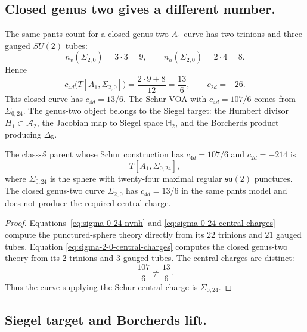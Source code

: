 \subsection*{Closed genus two gives a different number.}

The same pants count for a closed genus-two $A_1$ curve has two
trinions and three gauged $SU(2)$ tubes:
\begin{equation}
  n_v(\Sigma_{2,0})=3\cdot3=9,
  \qquad
  n_h(\Sigma_{2,0})=2\cdot4=8.
  \label{eq:sigma-2-0-nvnh}
\end{equation}
Hence
\begin{equation}
  c_{4d}\big(T[A_1,\Sigma_{2,0}]\big)
  =\frac{2\cdot9+8}{12}
  =\frac{13}{6},
  \qquad
  c_{2d}=-26.
  \label{eq:sigma-2-0-central-charges}
\end{equation}
This closed curve has \(c_{4d}=13/6\). The Schur VOA with
$c_{4d}=107/6$ comes from \(\Sigma_{0,24}\). The genus-two object belongs to the Siegel
target: the Humbert divisor $H_1\subset\mathcal A_2$, the Jacobian
map to Siegel space $\mathbb H_2$, and the Borcherds product
producing $\Delta_5$.

\begin{proposition}
\label{prop:gaiotto-curve-k3e}
The class-$\mathcal S$ parent whose Schur construction has
$c_{4d}=107/6$ and $c_{2d}=-214$ is
\[
  T[A_1,\Sigma_{0,24}],
\]
where $\Sigma_{0,24}$ is the sphere with twenty-four maximal regular
$\mathfrak{su}(2)$ punctures.  The closed genus-two curve
$\Sigma_{2,0}$ has $c_{4d}=13/6$ in the same pants model and does not
produce the required central charge.
\end{proposition}

\begin{proof}
Equations~\eqref{eq:sigma-0-24-nvnh} and
\eqref{eq:sigma-0-24-central-charges} compute the punctured-sphere
theory directly from its $22$ trinions and $21$ gauged tubes.  Equation
\eqref{eq:sigma-2-0-central-charges} computes the closed genus-two
theory from its $2$ trinions and $3$ gauged tubes.  The central charges
are distinct:
\[
  \frac{107}{6}\neq\frac{13}{6}.
\]
Thus the curve supplying the Schur central charge is
$\Sigma_{0,24}$.
\end{proof}

\subsection*{Siegel target and Borcherds lift.}

